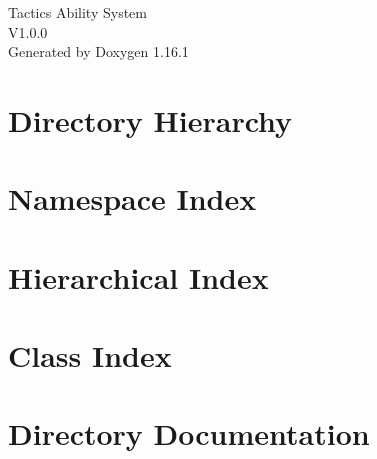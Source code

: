 \documentclass[twoside]{book}
\newcommand{\+}{\discretionary{\mbox{\scriptsize$\hookleftarrow$}}{}{}}
\newcommand{\clearemptydoublepage}{%
    \newpage{\pagestyle{empty}\cleardoublepage}%
  }
\begin{document}
  \raggedbottom
    \hypersetup{pageanchor=false,
                bookmarksnumbered=true,
                pdfencoding=unicode
               }
  \begin{titlepage}
  \vspace*{7cm}
  \begin{center}%
  {\Large Tactics Ability System}\\
  [1ex]\large V1.\+0.\+0 \\
  \vspace*{1cm}
  {\large Generated by Doxygen 1.16.1}\\
  \end{center}
  \end{titlepage}
  \clearemptydoublepage
  \tableofcontents
  \clearemptydoublepage
  \hypersetup{pageanchor=true}







\chapter{Directory Hierarchy}

\chapter{Namespace Index}

\chapter{Hierarchical Index}

\chapter{Class Index}

\chapter{Directory Documentation}













\end{document}
